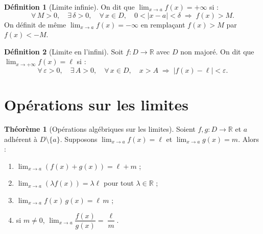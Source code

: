 \documentclass[12pt,a4paper,openany]{book}
\theoremstyle{definition}
\newtheorem{definition}{Définition}[chapter]
\newtheorem{theoreme}{Théorème}[chapter]
\newcommand{\R}{\mathbb{R}}
\begin{document}
\begin{definition}[Limite infinie]\label{def:limite-infinie}
On dit que $\lim_{x \to a} f(x) = +\infty$ si :
\[
  \forall\, M > 0,\quad \exists\, \delta > 0,\quad
  \forall\, x \in D,\quad 0 < |x - a| < \delta \;\Longrightarrow\; f(x) > M.
\]
On définit de même $\lim_{x \to a} f(x) = -\infty$ en remplaçant $f(x) > M$ par $f(x) < -M$.
\end{definition}

\begin{definition}[Limite en l'infini]\label{def:limite-infini}
Soit $f \colon D \to \R$ avec $D$ non majoré. On dit que $\lim_{x \to +\infty} f(x) = \ell$ si :
\[
  \forall\, \varepsilon > 0,\quad \exists\, A > 0,\quad
  \forall\, x \in D,\quad x > A \;\Longrightarrow\; |f(x) - \ell| < \varepsilon.
\]
\end{definition}

\section{Opérations sur les limites}\label{sec:operations-limites}

\begin{theoreme}[Opérations algébriques sur les limites]\label{thm:operations-limites}
Soient $f, g \colon D \to \R$ et $a$ adhérent à $D \setminus \{a\}$. Supposons $\lim_{x \to a} f(x) = \ell$ et $\lim_{x \to a} g(x) = m$. Alors :
\begin{enumerate}[label=\textup{(\roman*)}]
  \item $\lim_{x \to a} (f(x) + g(x)) = \ell + m$ ;
  \item $\lim_{x \to a} (\lambda f(x)) = \lambda \ell$ pour tout $\lambda \in \R$ ;
  \item $\lim_{x \to a} f(x)\,g(x) = \ell\, m$ ;
  \item si $m \neq 0$, $\lim_{x \to a} \dfrac{f(x)}{g(x)} = \dfrac{\ell}{m}$.
\end{enumerate}
\end{theoreme}
\end{document}
